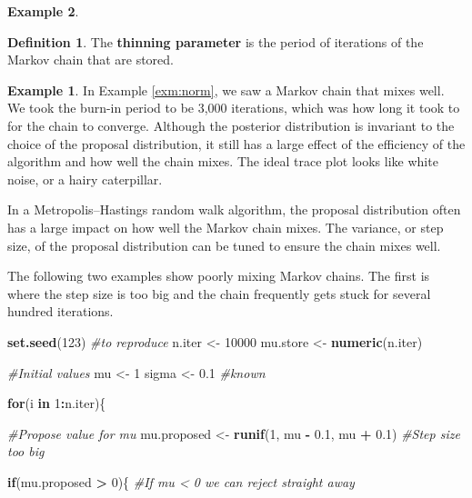 \documentclass[
]{book}
\newenvironment{Shaded}{\begin{snugshade}}{\end{snugshade}}
\newcommand{\CommentTok}[1]{\textcolor[rgb]{0.56,0.35,0.01}{\textit{#1}}}
\newcommand{\ControlFlowTok}[1]{\textcolor[rgb]{0.13,0.29,0.53}{\textbf{#1}}}
\newcommand{\DecValTok}[1]{\textcolor[rgb]{0.00,0.00,0.81}{#1}}
\newcommand{\FloatTok}[1]{\textcolor[rgb]{0.00,0.00,0.81}{#1}}
\newcommand{\FunctionTok}[1]{\textcolor[rgb]{0.13,0.29,0.53}{\textbf{#1}}}
\newcommand{\NormalTok}[1]{#1}
\newcommand{\OtherTok}[1]{\textcolor[rgb]{0.56,0.35,0.01}{#1}}
\newcommand{\SpecialCharTok}[1]{\textcolor[rgb]{0.81,0.36,0.00}{\textbf{#1}}}
\theoremstyle{definition}
\newtheorem{definition}{Definition}[chapter]
\theoremstyle{definition}
\newtheorem{example}{Example}[chapter]
\theoremstyle{definition}
\theoremstyle{definition}
\theoremstyle{remark}
\begin{document}
\begin{example}
\begin{definition}
The \textbf{thinning parameter} is the period of iterations of the Markov chain that are stored.
\end{definition}

\begin{example}
In Example \ref{exm:norm}, we saw a Markov chain that mixes well. We took the burn-in period to be 3,000 iterations, which was how long it took to for the chain to converge. Although the posterior distribution is invariant to the choice of the proposal distribution, it still has a large effect of the efficiency of the algorithm and how well the chain mixes. The ideal trace plot looks like white noise, or a hairy caterpillar.

In a Metropolis--Hastings random walk algorithm, the proposal distribution often has a large impact on how well the Markov chain mixes. The variance, or step size, of the proposal distribution can be tuned to ensure the chain mixes well.

The following two examples show poorly mixing Markov chains. The first is where the step size is too big and the chain frequently gets stuck for several hundred iterations.

\begin{Shaded}
\begin{Highlighting}[]
\FunctionTok{set.seed}\NormalTok{(}\DecValTok{123}\NormalTok{) }\CommentTok{\#to reproduce}
\NormalTok{n.iter   }\OtherTok{\textless{}{-}} \DecValTok{10000}
\NormalTok{mu.store }\OtherTok{\textless{}{-}} \FunctionTok{numeric}\NormalTok{(n.iter)}

\CommentTok{\#Initial values}
\NormalTok{mu }\OtherTok{\textless{}{-}} \DecValTok{1} 
\NormalTok{sigma }\OtherTok{\textless{}{-}} \FloatTok{0.1} \CommentTok{\#known}

\ControlFlowTok{for}\NormalTok{(i }\ControlFlowTok{in} \DecValTok{1}\SpecialCharTok{:}\NormalTok{n.iter)\{}
  
  \CommentTok{\#Propose value for mu}
\NormalTok{  mu.proposed }\OtherTok{\textless{}{-}} \FunctionTok{runif}\NormalTok{(}\DecValTok{1}\NormalTok{, mu }\SpecialCharTok{{-}} \FloatTok{0.1}\NormalTok{, mu }\SpecialCharTok{+} \FloatTok{0.1}\NormalTok{) }\CommentTok{\#Step size too big}
  
  \ControlFlowTok{if}\NormalTok{(mu.proposed }\SpecialCharTok{\textgreater{}} \DecValTok{0}\NormalTok{)\{ }\CommentTok{\#If mu \textless{} 0 we can reject straight away}
    

\end{Highlighting}
\end{Shaded}
\end{example}
\end{example}
\end{document}

